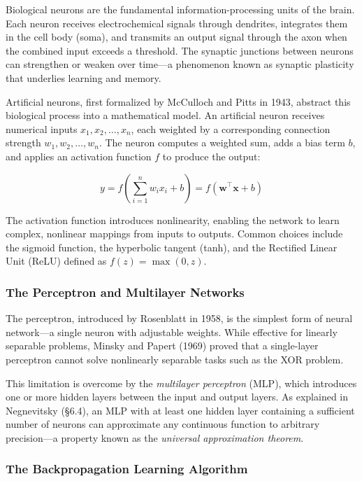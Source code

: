 \documentclass[11pt, a4paper]{article}
\begin{document}
Biological neurons are the fundamental information-processing units of the brain.
Each neuron receives electrochemical signals through dendrites, integrates them in
the cell body (soma), and transmits an output signal through the axon when the
combined input exceeds a threshold. The synaptic junctions between neurons can
strengthen or weaken over time---a phenomenon known as synaptic plasticity that
underlies learning and memory.

Artificial neurons, first formalized by McCulloch and Pitts in 1943, abstract this
biological process into a mathematical model. An artificial neuron receives
numerical inputs $x_1, x_2, \ldots, x_n$, each weighted by a corresponding
connection strength $w_1, w_2, \ldots, w_n$. The neuron computes a weighted sum,
adds a bias term $b$, and applies an activation function $f$ to produce the output:

\begin{equation}\label{eq:neuron}
y = f\left(\sum_{i=1}^{n} w_i x_i + b\right) = f(\mathbf{w}^\top \mathbf{x} + b)
\end{equation}

The activation function introduces nonlinearity, enabling the network to learn
complex, nonlinear mappings from inputs to outputs. Common choices include the
sigmoid function, the hyperbolic tangent (tanh), and the Rectified Linear Unit
(ReLU) defined as $f(z) = \max(0, z)$.

\subsubsection{The Perceptron and Multilayer Networks}

The perceptron, introduced by Rosenblatt in 1958, is the simplest form of neural
network---a single neuron with adjustable weights. While effective for linearly
separable problems, Minsky and Papert (1969) proved that a single-layer perceptron
cannot solve nonlinearly separable tasks such as the XOR problem.

This limitation is overcome by the \textit{multilayer perceptron} (MLP), which
introduces one or more hidden layers between the input and output layers. As
explained in Negnevitsky (\S6.4), an MLP with at least one hidden layer containing
a sufficient number of neurons can approximate any continuous function to arbitrary
precision---a property known as the \textit{universal approximation theorem}.

\subsubsection{The Backpropagation Learning Algorithm}\label{sec:backprop}
\end{document}
